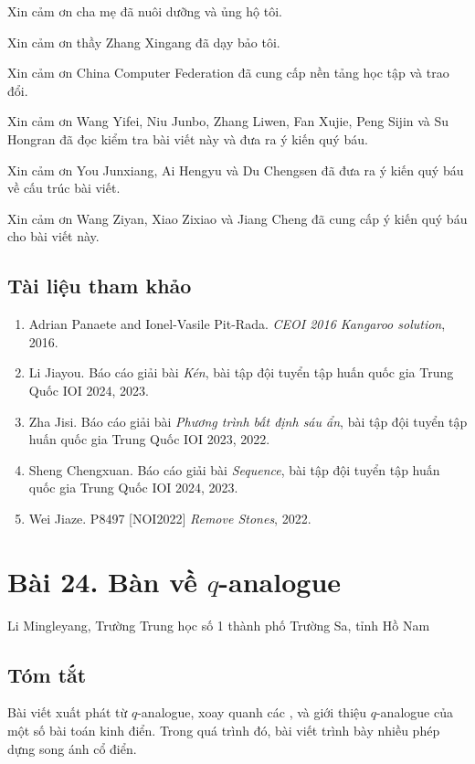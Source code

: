 \documentclass[11pt]{article}
\begin{document}
Xin cảm ơn cha mẹ đã nuôi dưỡng và ủng hộ tôi.

Xin cảm ơn thầy Zhang Xingang đã dạy bảo tôi.

Xin cảm ơn China Computer Federation đã cung cấp nền tảng học tập và trao đổi.

Xin cảm ơn Wang Yifei, Niu Junbo, Zhang Liwen, Fan Xujie, Peng Sijin và Su
Hongran đã đọc kiểm tra bài viết này và đưa ra ý kiến quý báu.

Xin cảm ơn You Junxiang, Ai Hengyu và Du Chengsen đã đưa ra ý kiến quý báu về
cấu trúc bài viết.

Xin cảm ơn Wang Ziyan, Xiao Zixiao và Jiang Cheng đã cung cấp ý kiến quý báu
cho bài viết này.

\subsection*{Tài liệu tham khảo}

\begin{enumerate}
\item Adrian Panaete and Ionel-Vasile Pit-Rada. \emph{CEOI 2016 Kangaroo
solution}, 2016.
\item Li Jiayou. Báo cáo giải bài \emph{Kén}, bài tập đội tuyển tập huấn quốc
gia Trung Quốc IOI 2024, 2023.
\item Zha Jisi. Báo cáo giải bài \emph{Phương trình bất định sáu ẩn}, bài tập
đội tuyển tập huấn quốc gia Trung Quốc IOI 2023, 2022.
\item Sheng Chengxuan. Báo cáo giải bài \emph{Sequence}, bài tập đội tuyển
tập huấn quốc gia Trung Quốc IOI 2024, 2023.
\item Wei Jiaze. P8497 [NOI2022] \emph{Remove Stones}, 2022.
\end{enumerate}

\section*{Bài 24. Bàn về \(q\)-analogue}

\begin{center}
Li Mingleyang, Trường Trung học số 1 thành phố Trường Sa, tỉnh Hồ Nam
\end{center}

\subsection*{Tóm tắt}

Bài viết xuất phát từ \(q\)-analogue, xoay quanh các , và giới
thiệu \(q\)-analogue của một số bài toán kinh điển. Trong quá trình đó, bài
viết trình bày nhiều phép dựng song ánh cổ điển.
\end{document}
